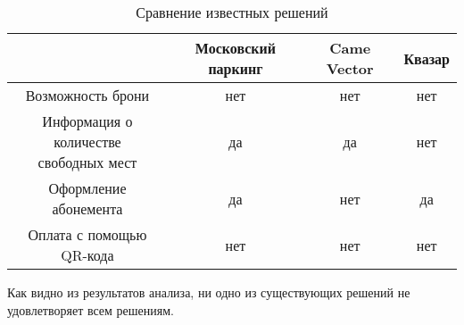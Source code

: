 \renewcommand{\thetable}{\thesubsection.\arabic{table}}
\begin{table}[H]
	\begin{center}
		\begin{center}
			\caption{\label{tab:existing_decision}Сравнение известных решений}
		\end{center}
		\begin{tabular}{|c|c|c|c|}
			\hline 
			~ & Московский паркинг & Came Vector & Квазар \\ \hline
        Возможность брони & нет & нет & нет \\ \hline
        \specialcell{Информация о количестве \\ свободных мест} & да & да & нет \\ \hline
        Оформление абонемента & да & нет & да \\ \hline
        Оплата с помощью QR-кода & нет & нет & нет \\ \hline
		\end{tabular}
	\end{center}
\end{table}

Как видно из результатов анализа, ни одно из существующих решений не удовлетворяет всем решениям.






